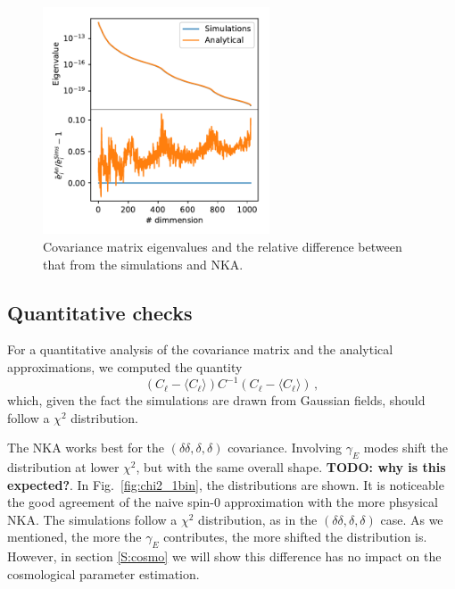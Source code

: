 \documentclass[a4paper,11pt]{article}
\newcommand{\todo}[1]{{\bf TODO: #1}}
\newcommand{\cl}{C_\ell}
\begin{document}
\begin{figure}[htb]
  \centering
  \includegraphics[width=0.6\textwidth]{./figures/run_sph_2b_NKA_TTTEEE_reldev_eigval_1stbin.pdf}
  \caption{Covariance matrix eigenvalues and the relative difference between
    that from the simulations and NKA.}
  \label{fig:eigv_1bin}
\end{figure}

\subsection{Quantitative checks}

For a quantitative analysis of the covariance matrix and the analytical
approximations, we computed the quantity 
\begin{equation}
  (\cl - \langle \cl \rangle )C^{-1} (\cl - \langle \cl \rangle)\,,
  \label{eq:chi2-def}
\end{equation}
which, given the fact the simulations are drawn from Gaussian fields, should
follow a $\chi^2$ distribution. 

The NKA works best for the $(\delta \delta, \delta, \delta)$ covariance.
Involving $\gamma_E$ modes shift the distribution at lower $\chi^2$, but with
the same overall shape. \todo{why is this expected?}. In
Fig.~\ref{fig:chi2_1bin}, the distributions are shown. It is noticeable the
good agreement of the naive spin-0 approximation with the more phsysical NKA.
The simulations follow a $\chi^2$ distribution, as in the $(\delta \delta,
\delta, \delta)$ case. As we mentioned, the more the $\gamma_E$ contributes,
the more shifted the distribution is. However, in section \ref{S:cosmo} we
will show this difference has no impact on the cosmological parameter
estimation.
\end{document}
